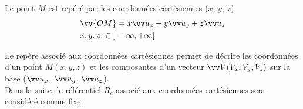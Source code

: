 \documentclass[10.5pt,a4paper]{book}
\begin{document}
\begin{boite}
\begin{minipage}{.5\textwidth}
\end{minipage}
\hfill
\begin{minipage}{.48\textwidth}
\begin{flushleft}
Le point $M$ est repéré par les coordonnées cartésiennes ($x$, $y$, $z$)
\begin{align*}
&\vv{OM} = x \vv u_x + y \vv u_y + z \vv u_z \\ &x, y, z \ \in \ ]-\infty, +\infty[
\end{align*}
\end{flushleft} 
\end{minipage}

Le repère associé aux coordonnées cartésiennes permet de décrire les coordonnées d’un point $M(x, y, z)$ et les composantes d’un vecteur $\vv V(V_x, V_y, V_z)$ sur la base ($\vv u_x$, $\vv u_y$, $\vv u_z$).\\

Dans la suite, le référentiel $R_c$ associé aux coordonnées cartésiennes sera considéré comme fixe.
\end{boite}
\end{document}
